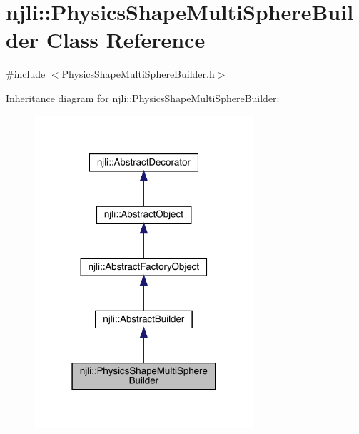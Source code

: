 \hypertarget{classnjli_1_1_physics_shape_multi_sphere_builder}{}\section{njli\+:\+:Physics\+Shape\+Multi\+Sphere\+Builder Class Reference}
\label{classnjli_1_1_physics_shape_multi_sphere_builder}


{\ttfamily \#include $<$Physics\+Shape\+Multi\+Sphere\+Builder.\+h$>$}



Inheritance diagram for njli\+:\+:Physics\+Shape\+Multi\+Sphere\+Builder\+:\nopagebreak
\begin{figure}[H]
\begin{center}
\leavevmode
\includegraphics[width=231pt]{classnjli_1_1_physics_shape_multi_sphere_builder__inherit__graph}
\end{center}
\end{figure}


